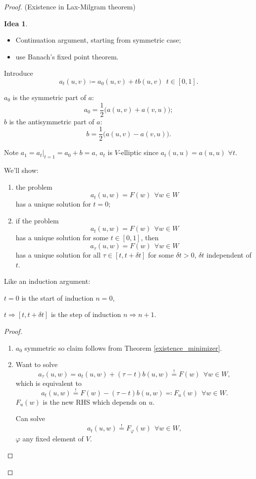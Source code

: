 \documentclass[12pt]{article}
\theoremstyle{definition}
\newtheorem*{idea}{Idea}
\begin{document}
\begin{proof}
(Existence in Lax-Milgram theorem)
\begin{idea}
\begin{itemize}
\item Continuation argument, starting from symmetric case;
\item use Banach's fixed point theorem.
\end{itemize}
\end{idea}

Introduce
\[a_t(u,v)\coloneqq a_0(u,v)+tb(u,v)\ \ t\in[0,1].\]

$a_0$ is the symmetric part of $a$:
\[a_0=\frac12\big(a(u,v)+a(v,u)\big);\]
$b$ is the antisymmetric part of $a$:
\[b=\frac12\big(a(u,v)-a(v,u)\big).\]

Note $a_1=a_t|_{t=1}=a_0+b=a$, $a_t$ is $V$-elliptic since $a_t(u,u)=a(u,u)$ $\forall t$.

We'll show:
\begin{enumerate}[label=(\arabic*)]
\item the problem
\[a_t(u,w)=F(w)\ \ \forall w\in W\]
has a unique solution for $t=0$;
\item if the problem
\[a_t(u,w)=F(w)\ \ \forall w\in W\]
has a unique solution for some $t\in[0,1]$, then
\[a_\tau(u,w)=F(w)\ \ \forall w\in W\]
has a unique solution for all $\tau\in[t,t+\delta t]$ for some $\delta t>0$, $\delta t$ independent of $t$.
\end{enumerate}

Like an induction argument:

$t=0$ is the start of induction $n=0$,

$t\Rightarrow[t,t+\delta t]$ is the step of induction $n\Rightarrow n+1$.

\begin{proof}
\begin{enumerate}[label=(\arabic*)]
\item $a_0$ symmetric so claim follows from Theorem \ref{existence_minimizer}.

\item Want to solve
\[a_\tau(u,w)=a_t(u,w)+(\tau-t)b(u,w)\overset!=F(w)\ \ \forall w\in W,\]
which is equivalent to
\begin{equation}\tag{$**$}\label{LM_u-dep}
a_t(u,w)\overset!=F(w)-(\tau-t)b(u,w)\eqqcolon F_u(w)\ \ \forall w\in W.
\end{equation}
$F_u(w)$ is the new RHS which depends on $u$.

Can solve
\begin{equation}\tag{$*$}\label{LM_phi-dep}
a_t(u,w)\overset!=F_\varphi(w)\ \ \forall w\in W,
\end{equation}
$\varphi$ any fixed element of $V$.


\end{enumerate}
\end{proof}
\end{proof}
\end{document}
